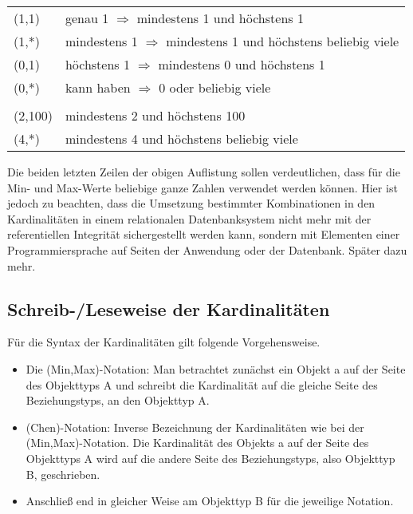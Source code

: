           \begin{supertabular}[ht]{lp{11cm}}
            (1,1) & genau 1 $\Longrightarrow$ mindestens 1 und höchstens 1\\
            (1,*) & mindestens 1 $\Longrightarrow$ mindestens 1 und höchstens beliebig viele\\
            (0,1) & höchstens 1 $\Longrightarrow$ mindestens 0 und höchstens 1\\
            (0,*) & kann haben $\Longrightarrow$ 0 oder beliebig viele\\
            \\
            (2,100) & mindestens 2 und höchstens 100\\
            (4,*) & mindestens 4 und höchstens beliebig viele\\
          \end{supertabular}

          Die beiden letzten Zeilen der obigen Auflistung sollen verdeutlichen, dass für die Min- und Max-Werte beliebige ganze Zahlen verwendet werden können. Hier ist jedoch zu beachten, dass die Umsetzung bestimmter Kombinationen in den Kardinalitäten in einem relationalen Datenbanksystem nicht mehr mit der referentiellen Integrität sichergestellt werden kann, sondern mit Elementen einer Programmiersprache auf Seiten der Anwendung oder der Datenbank. Später dazu mehr.
          \subsection{Schreib-/Leseweise der Kardinalitäten}
          Für die Syntax der Kardinalitäten gilt folgende Vorgehensweise.
          \begin{itemize}
            \item Die (Min,Max)-Notation: Man betrachtet zunächst ein Objekt a auf der Seite des Objekttyps A und schreibt die Kardinalität auf die gleiche Seite des Beziehungstyps, an den Objekttyp A.
            \item (Chen)-Notation: Inverse Bezeichnung der Kardinalitäten wie bei der (Min,Max)-Notation. Die Kardinalität des Objekts a auf der Seite des Objekttyps A wird auf die andere Seite des Beziehungstyps, also Objekttyp B, geschrieben.
            \item Anschließ end in gleicher Weise am Objekttyp B für die jeweilige Notation.
          \end{itemize}
